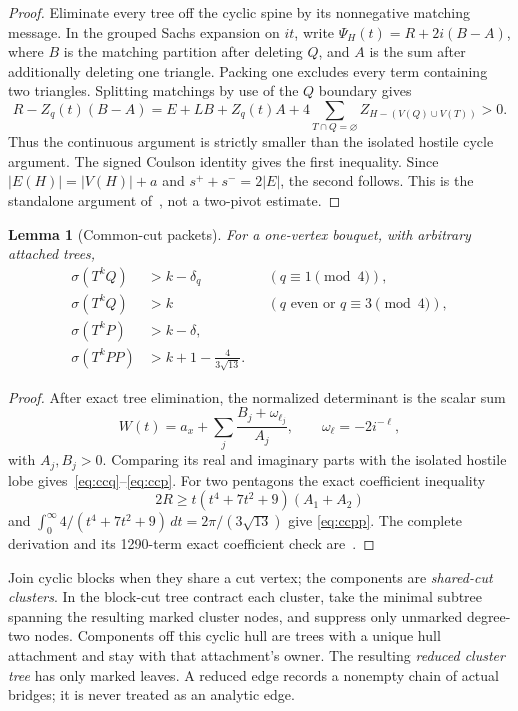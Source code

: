 \documentclass[11pt]{article}
\newtheorem{lemma}[theorem]{Lemma}
\newcommand{\spE}{s^+}
\newcommand{\smE}{s^-}
\newcommand{\sig}{\sigma}
\begin{document}
\begin{proof}
Eliminate every tree off the cyclic spine by its nonnegative matching message.
In the grouped Sachs expansion on $it$, write
$\Psi_H(t)=R+2i(B-A)$, where $B$ is the matching partition after deleting
$Q$, and $A$ is the sum after additionally deleting one triangle.  Packing
one excludes every term containing two triangles.  Splitting matchings by use
of the $Q$ boundary gives
\[
 R-Z_q(t)(B-A)=E+LB+Z_q(t)A+
 4\sum_{T\cap Q=\varnothing}Z_{H-(V(Q)\cup V(T))}>0.
\]
Thus the continuous argument is strictly smaller than the isolated hostile
cycle argument.  The signed Coulson identity gives the first inequality.
Since $|E(H)|=|V(H)|+a$ and $\spE+\smE=2|E|$, the second follows.  This is the
standalone argument of~\cite{Packing}, not a two-pivot estimate.
\end{proof}

\begin{lemma}[Common-cut packets]\label{lem:common}
For a one-vertex bouquet, with arbitrary attached trees,
\begin{align}
 \sig(T^kQ)&>k-\delta_q &&(q\equiv1\pmod4),\label{eq:ccq}\\
 \sig(T^kQ)&>k &&(q\text{ even or }q\equiv3\pmod4),\label{eq:ccgood}\\
 \sig(T^kP)&>k-\delta,\label{eq:ccp}\\
 \sig(T^kPP)&>k+1-\frac4{3\sqrt{13}}.\label{eq:ccpp}
\end{align}
\end{lemma}

\begin{proof}
After exact tree elimination, the normalized determinant is the scalar sum
\[
 W(t)=a_x+\sum_j\frac{B_j+\omega_{\ell_j}}{A_j},
 \qquad \omega_\ell=-2i^{-\ell},
\]
with $A_j,B_j>0$.  Comparing its real and imaginary parts with the isolated
hostile lobe gives~\eqref{eq:ccq}--\eqref{eq:ccp}.  For two pentagons the exact
coefficient inequality
\[
 2R\geq t(t^4+7t^2+9)(A_1+A_2)
\]
and $\int_0^\infty4/(t^4+7t^2+9)\,dt=2\pi/(3\sqrt{13})$ give
\eqref{eq:ccpp}.  The complete derivation and its 1290-term exact coefficient
check are~\cite{CommonCut,Coefficient}.
\end{proof}

Join cyclic blocks when they share a cut vertex; the components are
\emph{shared-cut clusters}.  In the block-cut tree contract each cluster, take
the minimal subtree spanning the resulting marked cluster nodes, and suppress
only unmarked degree-two nodes.  Components off this cyclic hull are trees with
a unique hull attachment and stay with that attachment's owner.  The resulting
\emph{reduced cluster tree} has only marked leaves.  A reduced edge records a
nonempty chain of actual bridges; it is never treated as an analytic edge.
\end{document}
